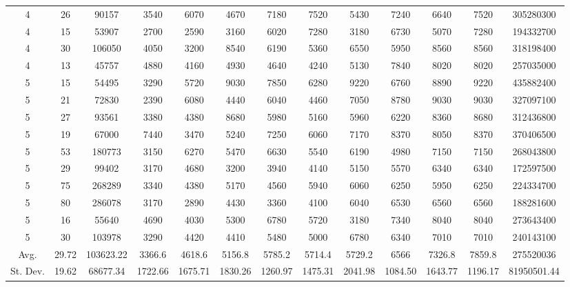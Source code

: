 \documentclass[journal]{IEEEtran}
\begin{document}
\begin{table}
\begin{tabular}{|ccc|cccccccc|cc|}
4	&	26	&	90157	&	3540	&	6070	&	4670	&	7180	&	7520	&	5430	&	7240	&	6640	&	7520	&	305280300	\\
4	&	15	&	53907	&	2700	&	2590	&	3160	&	6020	&	7280	&	3180	&	6730	&	5070	&	7280	&	194332700	\\
4	&	30	&	106050	&	4050	&	3200	&	8540	&	6190	&	5360	&	6550	&	5950	&	8560	&	8560	&	318198400	\\
4	&	13	&	45757	&	4880	&	4160	&	4930	&	4640	&	4240	&	5130	&	7840	&	8020	&	8020	&	257035000	\\
\hline
5	&	15	&	54495	&	3290	&	5720	&	9030	&	7850	&	6280	&	9220	&	6760	&	8890	&	9220	&	435882400	\\
5	&	21	&	72830	&	2390	&	6080	&	4440	&	6040	&	4460	&	7050	&	8780	&	9030	&	9030	&	327097100	\\
5	&	27	&	93561	&	3380	&	4380	&	8680	&	5980	&	5160	&	5960	&	6220	&	8360	&	8680	&	312436800	\\
5	&	19	&	67000	&	7440	&	3470	&	5240	&	7250	&	6060	&	7170	&	8370	&	8050	&	8370	&	370406500	\\
5	&	53	&	180773	&	3150	&	6270	&	5470	&	6630	&	5540	&	6190	&	4980	&	7150	&	7150	&	268043800	\\
5	&	29	&	99402	&	3170	&	4680	&	3200	&	3940	&	4140	&	5150	&	5570	&	6340	&	6340	&	172597500	\\
5	&	75	&	268289	&	3340	&	4380	&	5170	&	4560	&	5940	&	6060	&	6250	&	5950	&	6250	&	224334700	\\
5	&	80	&	286078	&	3170	&	2890	&	4430	&	3360	&	4100	&	6040	&	6530	&	6560	&	6560	&	188281600	\\
5	&	16	&	55640	&	4690	&	4030	&	5300	&	6780	&	5720	&	3180	&	7340	&	8040	&	8040	&	273643400	\\
5	&	30	&	103978	&	3290	&	4420	&	4410	&	5480	&	5000	&	6780	&	6340	&	7010	&	7010	&	240143100	\\
\hline
Avg.	&	29.72	&	103623.22	&	3366.6	&	4618.6	&	5156.8	&	5785.2	&	5714.4	&	5729.2	&	6566	&	7326.8	&	7859.8	&	275520036	\\
St. Dev.	&	19.62	&	68677.34	&	1722.66	&	1675.71	&	1830.26	&	1260.97	&	1475.31	&	2041.98	&	1084.50	&	1643.77	&	1196.17	&	81950501.44	\\
\hline																				
\end{tabular}
\end{table}
\end{document}
